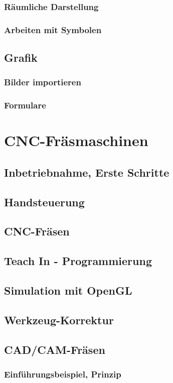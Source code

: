\documentclass[14pt,a4paper]{book}
\begin{document}
		\subsection{Räumliche Darstellung}
		\subsection{Arbeiten mit Symbolen}
	\section{Grafik}
		\subsection{Bilder importieren}
		\subsection{Formulare}
	 
\chapter{CNC-Fräsmaschinen} 
	\section{Inbetriebnahme, Erste Schritte}
	\section{Handsteuerung}
	\section{CNC-Fräsen}
	\section{Teach In - Programmierung} 
	\section{Simulation mit OpenGL} 
	\section{Werkzeug-Korrektur} 
	\section{CAD/CAM-Fräsen} 
		\subsection{Einführungsbeispiel, Prinzip} 
\end{document}
